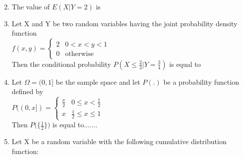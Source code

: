 \documentclass[journal,12pt,twocolumn]{IEEEtran}
\begin{document}
\begin{enumerate}
\begin{enumerate}
\begin{multicols}{2}
\end{multicols}
\end{enumerate}

\item The value of $E(X|Y=2)$ is

\begin{enumerate}
\end{enumerate}

\item Let X and Y be two random variables having the joint probability density function \\

$
f(x,y)=
\begin{cases}
2 &  0<x<y<1 \\
0 & \text{otherwise}
\end{cases}
$ \\
Then the conditional probability $P(X \leqslant {\frac{2}{3}}| Y={\frac{3}{4}})$ is equal to

\begin{enumerate}
\end{enumerate}

\item Let $\Omega = (0,1]$ be the sample space and let $P(.)$ be a probability function defined by \\
$
P((0,x])=
\begin{cases}
\frac{x}{2} 
&  0 \leqslant x < \frac{1}{2} \\
x &  \frac{1}{2} \leqslant x \leqslant 1
\end{cases}
$ \\
Then $P \bigg ( \{ \frac{1}{2} \} \bigg )$ is equal to.......

\item Let X be a random variable with the following cumulative distribution function: \\


\end{enumerate}
\end{document}
